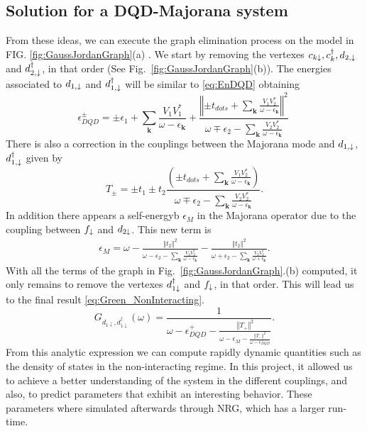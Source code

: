 \documentclass[showpacs,aps,prb,reprint,superscriptaddress]{revtex4-2}
\begin{document}
\subsection{Solution for a DQD-Majorana system}
From these ideas, we can execute the graph elimination process on the model in FIG. \ref{fig:GaussJordanGraph}(a) .  We start by removing the vertexes $c_{k\downarrow},c^\dagger_k, d_{2,\downarrow}$ and $ d^\dagger_{2,\downarrow}$, in that order (See Fig.\ \ref{fig:GaussJordanGraph}(b)). The energies associated to $d_{1,\downarrow}$ and $d^\dagger_{1,\downarrow}$ will be similar to \eqref{eq:EnDQD} obtaining
\begin{equation}
    \epsilon_{DQD}^{\pm}=\pm\epsilon_{1}+\sum_{\mathbf{k}}\frac{V_{1}V_{1}^{*}}{\omega-\epsilon_{\mathbf{k}}}+\frac{\left\Vert \pm t_{dots}+\sum_{\mathbf{k}}\frac{V_{1}V_{2}^{*}}{\omega-\epsilon_{\mathbf{k}}}\right\Vert ^{2}}{\omega\mp\epsilon_{2}-\sum_{\mathbf{k}}\frac{V_{2}V_{2}^{*}}{\omega-\epsilon_{\mathbf{k}}}} \; \label{eq:epDQD+-}
\end{equation}
\noindent There is also a correction in the couplings between the Majorana mode and $d_{1,\downarrow}$, $d^\dagger_{1,\downarrow}$ given by 
\begin{equation}
    T_{\pm}=\pm t_{1}\pm t_{2}\frac{\left(\pm t_{dots}+\sum_{\mathbf{k}}\frac{V_{1}V_{2}^{*}}{\omega-\epsilon_{\mathbf{k}}}\right)}{\omega\mp\epsilon_{2}-\sum_{\mathbf{k}}\frac{V_{2}V_{2}^{*}}{\omega-\epsilon_{\mathbf{k}}}}. \label{eq:T+-}
\end{equation}
In addition there appears a self-energyb $\epsilon_M$ in the  Majorana operator due to the coupling between $f_\downarrow$ and $d_{2\downarrow}$. This new term is 
\begin{equation}
    \begin{aligned}
        \epsilon_{M}=  \omega -\frac{\left\Vert t_{2}\right\Vert ^{2} } {\omega-\epsilon_{2}-\sum_{\mathbf{k}}\frac{V_{2}V_{2}^{*}}{\omega-\epsilon_{\mathbf{k}}}} 
         - \frac{\left\Vert t_{2}\right\Vert ^{2}}{\omega+\epsilon_{2}-\sum_{\mathbf{k}}\frac{V_{2}V_{2}^{*}}{\omega+\epsilon_{\mathbf{k}}}}. 
    \end{aligned}
    \label{eq:M2_append}
\end{equation}
With all the terms of the graph in Fig.\ \ref{fig:GaussJordanGraph}.(b) computed, it only remains to remove the vertexes $d^\dagger_{1\downarrow}$ and $f_\downarrow$, in that order. This will lead us to the final result \eqref{eq:Green_NonInteracting}. 
\begin{equation}
    G_{{d_{1\downarrow},d_{1\downarrow}^{\dagger}}}\left(\omega\right)=\frac{1}{\omega-\epsilon_{DQD}^{+}-\frac{\left\Vert T_{+}\right\Vert ^{2}}{\omega-\epsilon_{M}-\frac{\left\Vert T_{-}\right\Vert ^{2}}{\omega - \epsilon_{DQD}^{-}}}}.
     \label{eq:2Green_NonInteracting}
\end{equation}
\noindent From this analytic expression we can compute rapidly dynamic quantities such as the density of states in the non-interacting regime. In this project, it allowed us to achieve a better understanding of the system in the different couplings, and also, to predict parameters that exhibit an interesting behavior. These parameters where simulated afterwards through NRG, which has a larger run-time. 
\end{document}
